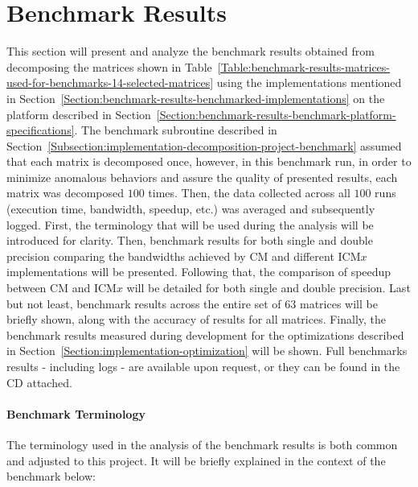 \section{Benchmark Results \TO}
This section will present and analyze the benchmark results obtained from decomposing the matrices shown in Table~\ref{Table:benchmark-results-matrices-used-for-benchmarks-14-selected-matrices} using the implementations mentioned in Section~\ref{Section:benchmark-results-benchmarked-implementations} on the platform described in Section~\ref{Section:benchmark-results-benchmark-platform-specifications}. The benchmark subroutine described in Section~\ref{Subsection:implementation-decomposition-project-benchmark} assumed that each matrix is decomposed once, however, in this benchmark run, in order to minimize anomalous behaviors and assure the quality of presented results, each matrix was decomposed $ 100 $ times. Then, the data collected across all $ 100 $ runs (execution time, bandwidth, speedup, etc.) was averaged and subsequently logged. First, the terminology that will be used during the analysis will be introduced for clarity. Then, benchmark results for both single and double precision comparing the bandwidths achieved by CM and different ICM$ x $ implementations will be presented. Following that, the comparison of speedup between CM and ICM$ x $ will be detailed for both single and double precision. Last but not least, benchmark results across the entire set of $ 63 $ matrices will be briefly shown, along with the accuracy of results for all matrices. Finally, the benchmark results measured during development for the optimizations described in Section~\ref{Section:implementation-optimization} will be shown. Full benchmarks results - including logs - are available upon request, or they can be found in the CD attached.

\paragraph{Benchmark Terminology} The terminology used in the analysis of the benchmark results is both common and adjusted to this project. It will be briefly explained in the context of the benchmark below:

